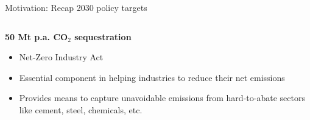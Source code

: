 \documentclass[10pt,aspectratio=169,dvipsnames]{beamer}
\begin{document}
\begin{frame}{Motivation: Recap 2030 policy targets}
\begin{columns}[T]
    \begin{column}{.3\textwidth}
        \begin{minipage}[t][.45\textheight]{\linewidth}
            \begin{exampleblock}{\textbf{50 Mt p.a. CO$_2$ sequestration}}
                \begin{itemize}
                  \item \alert{Net-Zero Industry Act}
                  \item Essential component in helping industries to reduce their net emissions
                  \item Provides means to capture unavoidable emissions from hard-to-abate sectors like cement, steel, chemicals, etc.
                \end{itemize}
            \end{exampleblock}
        \end{minipage}
    \end{column}
  \end{columns}

  \vspace{1.3cm}

\end{frame}
\end{document}
